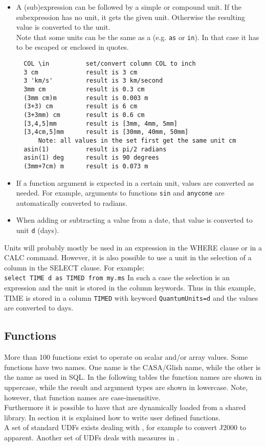 \begin{itemize}
 \item A (sub)expression can be followed by a simple or compound unit.
       If the subexpression has no unit, it gets the given unit.
       Otherwise the resulting value is converted to the unit.
       \\Note that some units can be the same as a
       (e.g. \texttt{as} or \texttt{in}).
       In that case it has to be escaped or enclosed in quotes.
\begin{verbatim}
  COL \in          set/convert column COL to inch
  3 cm             result is 3 cm
  3 'km/s'         result is 3 km/second
  3mm cm           result is 0.3 cm
  (3mm cm)m        result is 0.003 m
  (3+3) cm         result is 6 cm
  (3+3mm) cm       result is 0.6 cm
  [3,4,5]mm        result is [3mm, 4mm, 5mm]
  [3,4cm,5]mm      result is [30mm, 40mm, 50mm]
      Note: all values in the set first get the same unit cm
  asin(1)          result is pi/2 radians
  asin(1) deg      result is 90 degrees
  (3mm+7cm) m      result is 0.073 m
\end{verbatim}
 \item If a function argument is expected in a certain unit, values
	are converted as needed. For example, arguments to functions 
	\texttt{sin} and \texttt{anycone}
	are automatically converted to radians.
 \item When adding or subtracting a value from a date, that value is
	converted to unit \texttt{d} (days).
\end{itemize}
Units will probably mostly be used in an expression in the WHERE
clause or in a CALC command. However, it is also possible to use a
unit in the selection of a column in the SELECT clause. For example:
\\\texttt{select TIME d as TIMED from my.ms}
In such a case the selection is an expression and the unit is stored
in the column keywords. Thus in this example, TIME is stored in a
column \texttt{TIMED} with keyword \texttt{QuantumUnits=d} and the 
values are converted to days.

\subsection{\label{TAQL:FUNCTIONS}Functions}
More than 100 functions exist to operate on scalar and/or array values.
Some functions have two names. One name is the CASA/Glish name, while the
other is the name as used in SQL.
In the following tables the function names are shown in uppercase,
while the result and argument types are shown in lowercase.
Note, however, that function names are case-insensitive.
\\Furthermore it is possible to have 
that are dynamically loaded from a shared library. In section
 it is
explained how to write user defined functions.
\\A set of standard UDFs exists dealing with , for example to convert J2000 to apparent.
Another set of UDFs deals with measures in . 

